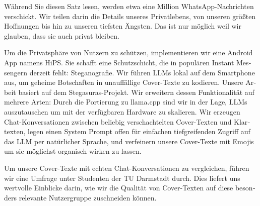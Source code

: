 \begin{otherlanguage}{ngerman}
Während Sie diesen Satz lesen, werden etwa eine Million WhatsApp-Nachrichten verschickt. Wir teilen darin die Details unseres Privatlebens, von unseren größten Hoffnungen bis hin zu unseren tiefsten Ängsten. Das ist nur möglich weil wir glauben, dass sie auch privat bleiben.

Um die Privatsphäre von Nutzern zu schützen, implementieren wir eine Android App namens \gls{HiPS}. Sie schafft eine Schutzschicht, die in populären Instant Messengern derzeit fehlt: Steganografie. Wir führen \glspl{LLM} lokal auf dem Smartphone aus, um geheime Botschaften in unauffällige Cover-Texte zu kodieren. Unsere Arbeit basiert auf dem Stegasuras-Projekt. Wir erweitern dessen Funktionalität auf mehrere Arten: Durch die Portierung zu llama.cpp sind wir in der Lage, \glspl{LLM} auszutauschen um mit der verfügbaren Hardware zu skalieren. Wir erzeugen Chat-Konversationen zwischen beliebig verschachtelten Cover-Texten und Klartexten, legen einen System Prompt offen für einfachen tiefgreifenden Zugriff auf das \gls{LLM} per natürlicher Sprache, und verfeinern unsere Cover-Texte mit Emojis um sie möglichst organisch wirken zu lassen.

Um unsere Cover-Texte mit echten Chat-Konversationen zu vergleichen, führen wir eine Umfrage unter Studenten der TU Darmstadt durch. Dies liefert uns wertvolle Einblicke darin, wie wir die Qualität von Cover-Texten auf diese besonders relevante Nutzergruppe zuschneiden können.
\end{otherlanguage}

\endgroup

\vfill
